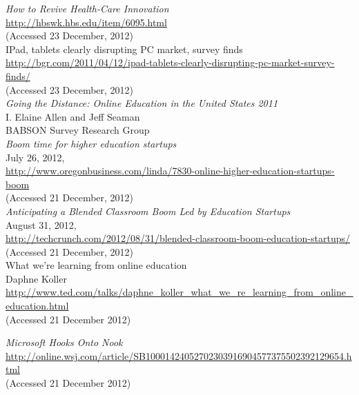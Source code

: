 \documentclass[a4paper,10pt]{article}
\begin{document}
\begin{thebibliography}{9}
  \emph{How to Revive Health-Care Innovation}\\
  \url{http://hbswk.hbs.edu/item/6095.html}\\
  (Accessed 23 December, 2012)\\
 

IPad, tablets clearly disrupting PC market, survey finds\\
\url{http://bgr.com/2011/04/12/ipad-tablets-clearly-disrupting-pc-market-survey-finds/}\\
  (Accessed 23 December, 2012)\\
 
  \emph{Going the Distance: Online Education in the United States 2011}\\
  I. Elaine Allen and Jeff Seaman\\
  BABSON Survey Research Group\\

  \emph{Boom time for higher education startups}\\ 
  July 26, 2012,\\
  \url{http://www.oregonbusiness.com/linda/7830-online-higher-education-startups-boom}\\
  (Accessed 21 December, 2012)\\

  \emph{Anticipating a Blended Classroom Boom Led by Education Startups}\\ 
  August 31, 2012,\\
  \url{  http://techcrunch.com/2012/08/31/blended-classroom-boom-education-startups/}\\
  (Accessed 21 December, 2012)\\

What we're learning from online education \\
Daphne Koller\\
\url{http://www.ted.com/talks/daphne_koller_what_we_re_learning_from_online_education.html}\\
  (Accessed 21 December 2012)

   \emph{Microsoft Hooks Onto Nook}\\
   \url{http://online.wsj.com/article/SB10001424052702303916904577375502392129654.html}\\
   (Accessed 21 December 2012)
   

\end{thebibliography}
\end{document}
